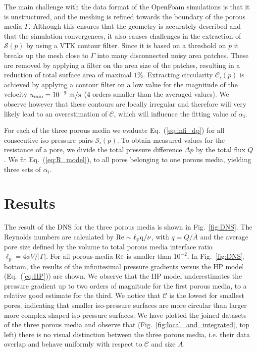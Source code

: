 \documentclass[draft]{agujournal2019}
\begin{document}
The main challenge with the data format of the OpenFoam simulations is that it is unstructured, and the meshing is refined towards the boundary of the porous media $\Gamma$. Although this ensures that the geometry is accurately described and that the simulation convergences, it also causes challenges in the extraction of $\mathcal{S}(p)$ by using a VTK contour filter. Since it is based on a threshold on $p$ it breaks up the mesh close to $\Gamma$ into many disconnected noisy area patches. These are removed by applying a filter on the area size of the patches, resulting in a reduction of total surface area of maximal $1\%$. Extracting circularity $\mathcal{C}_i(p)$ is achieved by applying a contour filter on a low value for the magnitude of the velocity $u_{\rm{min}} = 10^{-9}~\rm{m/s}$ (4 orders smaller than the averaged values). We observe however that these contours are locally irregular and therefore will very likely lead to an overestimation of $\mathcal{C}$, which will influence the fitting value of $\alpha_1$. 

For each of the three porous media we evaluate Eq.~(\ref{eq:infi_dp}) for all consecutive iso-pressure pairs $\mathcal{S}_i(p)$. To obtain measured values for the resistance of a pore, we divide the total pressure difference $\Delta p$ by the total flux $Q$. We fit Eq.~(\ref{eq:R_model}), to all pores belonging to one porous media, yielding three sets of $\alpha_i$.  


\section{Results}


The result of the DNS for the three porous media is shown in Fig.~\ref{fig:DNS}. The Reynolds numbers are calculated by $\rm{Re} \sim \ell_p q/\nu$, with $q = Q/\overline{A}$ and the average pore size defined by the volume to total porous media interface ratio $\ell_p = 4 \phi V/|\Gamma|$. For all porous media $\rm{Re}$ is smaller than $10^{-2}$. In Fig.~\ref{fig:DNS}, bottom, the results of the infinitesimal pressure gradients versus the HP model (Eq.~(\ref{eq:HP})) are shown. We observe that the HP model underestimates the pressure gradient up to two orders of magnitude for the first porous media, to a relative good estimate for the third. We notice that $\mathcal{C}$ is the lowest for smallest pores, indicating that smaller iso-pressure surfaces are more circular than larger more complex shaped iso-pressure surfaces. We have plotted the joined datasets of the three porous media and observe that (Fig.~\ref{fig:local_and_integrated}, top left) there is no visual distinction between the three porous media, i.e. their data overlap and behave uniformly with respect to $\mathcal{C}$ and size $A$.
 
\end{document}

